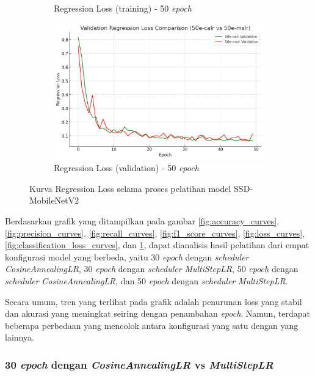 \begin{figure}[htbp]
\begin{subfigure}{0.45\textwidth}
    \caption{Regression Loss (training) - 50 \emph{epoch}}
  \end{subfigure}
  \hfill
  \begin{subfigure}{0.45\textwidth}
    \includegraphics[width=\textwidth]{gambar/bab4-val-regloss-50e.png}
    \caption{Regression Loss (validation) - 50 \emph{epoch}}
  \end{subfigure}
  \caption{Kurva Regression Loss selama proses pelatihan model SSD-MobileNetV2}
  \label{fig:regression_loss_curves}
\end{figure}      

Berdasarkan grafik yang ditampilkan pada gambar \ref{fig:accuracy_curves}, \ref{fig:precision_curves}, \ref{fig:recall_curves}, \ref{fig:f1_score_curves}, \ref{fig:loss_curves}, \ref{fig:classification_loss_curves}, dan \ref{fig:regression_loss_curves}, dapat dianalisis hasil pelatihan dari empat konfigurasi model yang berbeda, yaitu 30 \emph{epoch} dengan \emph{scheduler} \emph{CosineAnnealingLR}, 30 \emph{epoch} dengan \emph{scheduler} \emph{MultiStepLR}, 50 \emph{epoch} dengan \emph{scheduler} \emph{CosineAnnealingLR}, dan 50 \emph{epoch} dengan \emph{scheduler} \emph{MultiStepLR}.

Secara umum, tren yang terlihat pada grafik adalah penurunan loss yang stabil dan akurasi yang meningkat seiring dengan penambahan \emph{epoch}. Namun, terdapat beberapa perbedaan yang mencolok antara konfigurasi yang satu dengan yang lainnya.

\subsubsection{30 \emph{epoch} dengan \emph{CosineAnnealingLR} vs \emph{MultiStepLR}}

